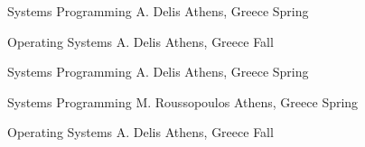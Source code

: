 


\begin{cvhonors}

  \cvhonor
    {Systems Programming} %
    {A. Delis} %
    {Athens, Greece} %
    {Spring} %

  \cvhonor
    {Operating Systems} %
    {A. Delis} %
    {Athens, Greece} %
    {Fall} %

\end{cvhonors}



\begin{cvhonors}

  \cvhonor
    {Systems Programming} %
    {A. Delis} %
    {Athens, Greece} %
    {Spring} %

  \cvhonor
    {Systems Programming} %
    {M. Roussopoulos} %
    {Athens, Greece} %
    {Spring} %

  \cvhonor
    {Operating Systems} %
    {A. Delis} %
    {Athens, Greece} %
    {Fall} %

\end{cvhonors}
